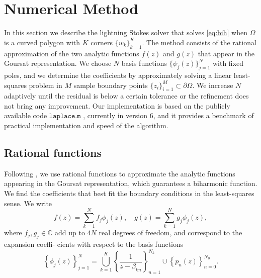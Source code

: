 
\section{Numerical Method \label{sec:method}}
In this section we describe the lightning Stokes solver that solves \eqref{eq:bih} when $\Omega$ is a curved polygon with $K$ corners $\{w_k\}_{k=1}^K$. The method consists of the rational approximation of the two analytic functions $f(z)$ and $g(z)$ that appear in the Goursat representation. We choose $N$ basis functions $\{\psi_j(z)\}_{j=1}^N$ with fixed poles, and we determine the coefficients by approximately solving a linear least-squares problem in $M$ sample boundary points $\{z_i\}_{i=1}^M \subset \partial\Omega$. We increase $N$ adaptively until the residual is below a certain tolerance or the refinement does not bring any improvement. Our implementation is based on the publicly available code $\texttt{laplace.m}$ \cite{tref20}, currently in version 6, and it provides a benchmark of practical implementation and speed of the algorithm.


\subsection{Rational functions}
Following \cite{gopal19}, we use rational functions to approximate the analytic functions appearing in the
Goursat representation, which guarantees a biharmonic function. We find the coefficients that
best fit the boundary conditions in the least-squares sense. We write
\begin{equation}
f(z) = \sum_{k=1}^N f_j \phi_j(z), \quad g(z) = \sum_{k=1}^N g_j \phi_j(z),
\end{equation}
where $f_j, g_j\in \mathbb{C}$ add up to $4N$ real degrees of freedom, and correspond to the expansion coeffi- cients with respect to the basis functions
\begin{equation}
\left\{\phi_j(z)\right\}_{j=1}^{N} =  \bigcup_{k=1}^K\left\{\frac{1}{z-\beta_{kn}}\right\}_{n=1}^{N_k} \cup \left\{p_n(z)\right\}_{n=0}^{N_0}.
\end{equation}

